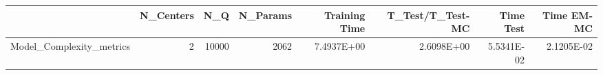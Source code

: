 \begin{tabular}{lrrrrrrr}
\toprule
{} &  N\_Centers &    N\_Q &  N\_Params &  Training Time &  T\_Test/T\_Test-MC &  Time Test &  Time EM-MC \\
\midrule
Model\_Complexity\_metrics &          2 &  10000 &      2062 &     7.4937E+00 &        2.6098E+00 & 5.5341E-02 &  2.1205E-02 \\
\bottomrule
\end{tabular}
